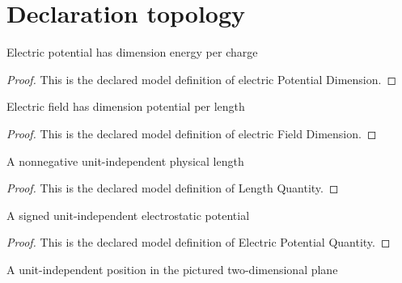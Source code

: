 \section{Declaration topology}
\begin{definition}
  \label{def:physics:phyx-mini-0871:phyxminiproblems-problemphyxmini0871-electricpotentialdimension}
  Electric potential has dimension energy per charge
\end{definition}
\begin{proof}
  This is the declared model definition of electric Potential Dimension.
\end{proof}
\begin{definition}
  \label{def:physics:phyx-mini-0871:phyxminiproblems-problemphyxmini0871-electricfielddimension}
  Electric field has dimension potential per length
\end{definition}
\begin{proof}
  This is the declared model definition of electric Field Dimension.
\end{proof}
\begin{definition}
  \label{def:physics:phyx-mini-0871:phyxminiproblems-problemphyxmini0871-lengthquantity}
  A nonnegative unit-independent physical length
\end{definition}
\begin{proof}
  This is the declared model definition of Length Quantity.
\end{proof}
\begin{definition}
  \label{def:physics:phyx-mini-0871:phyxminiproblems-problemphyxmini0871-electricpotentialquantity}
  A signed unit-independent electrostatic potential
\end{definition}
\begin{proof}
  This is the declared model definition of Electric Potential Quantity.
\end{proof}
\begin{definition}
  \label{def:physics:phyx-mini-0871:phyxminiproblems-problemphyxmini0871-planarpositionquantity}
  A unit-independent position in the pictured two-dimensional plane
\end{definition}
